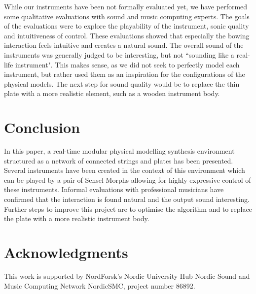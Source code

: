 While our instruments have been not formally evaluated yet, we have performed some qualitative evaluations with sound and music computing experts. The goals of the evaluations were to explore the playability of the instrument, sonic quality and intuitiveness of control. These evaluations showed that especially the bowing interaction feels intuitive and creates a natural sound. The overall sound of the instruments was generally judged to be interesting, but not ``sounding like a real-life instrument". This makes sense, as we did not seek to perfectly model each instrument, but rather used them as an inspiration for the configurations of the physical models. The next step for sound quality would be to replace the thin plate with a more realistic element, such as a wooden instrument body.


\section{Conclusion}\label{sec:conclusion}

In this paper, a real-time modular physical modelling synthesis environment structured as a network of connected strings and plates has been presented. Several instruments have been created in the context of this environment which can be played by a pair of Sensel Morphs allowing for highly expressive control of these instruments. Informal evaluations with professional musicians have confirmed that the interaction is found natural and the output sound interesting. Further steps to improve this project are to optimise the algorithm and to replace the plate with a more realistic instrument body.
\section{Acknowledgments}
This work is supported by NordForsk's Nordic
University Hub Nordic Sound and Music Computing Network
NordicSMC, project number 86892.
